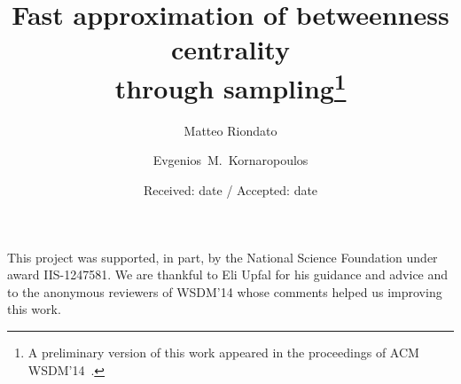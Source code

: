 \documentclass{svjour3}                     %
\begin{document}
\title{Fast approximation of betweenness centrality\\through sampling\thanks{A preliminary version of this work appeared in the
proceedings of ACM WSDM'14~\citep{RiondatoK14WSDM}.}}


\author{Matteo Riondato\and Evgenios~M.~Kornaropoulos}



\date{Received: date / Accepted: date}

\maketitle

\begin{abstract}
  
\end{abstract}











\begin{acknowledgements}
This project was supported, in part, by the National Science Foundation under
award IIS-1247581. We are thankful to Eli Upfal for his guidance and advice and
to the anonymous reviewers of WSDM'14 whose comments helped us improving this
work.
\end{acknowledgements}



\end{document}
